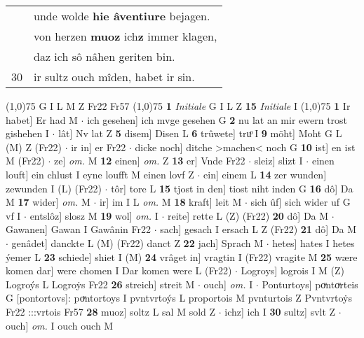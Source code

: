\documentclass[8pt,a4paper,notitlepage]{article}
\begin{document}
\begin{table}[ht]
\begin{minipage}[t]{0.5\linewidth}
\begin{tabular}{rl}
 & unde wolde \textbf{hie âventiure} bejagen.\\ 
 & von herzen \textbf{muoz} ich\textbf{z} immer klagen,\\ 
 & daz ich sô nâhen geriten bin.\\ 
30 & ir sultz ouch mîden, habet ir sin.\\ 
\end{tabular}
\scriptsize
\line(1,0){75} \newline
G I L M Z Fr22 Fr57 \newline
\line(1,0){75} \newline
\textbf{1} \textit{Initiale} G I L Z  \textbf{15} \textit{Initiale} I  \newline
\line(1,0){75} \newline
\textbf{1} Ir habet] Er had M  $\cdot$ ich gesehen] ich mvge gesehen G \textbf{2} nu lat an mir ewern trost gishehen I  $\cdot$ lât] Nv lat Z \textbf{5} disem] Disen L \textbf{6} trûwete] truͦ I \textbf{9} möht] Moht G L (M) Z (Fr22)  $\cdot$ ir in] er Fr22  $\cdot$ dicke noch] ditche >machen< noch G \textbf{10} ist] en ist M (Fr22)  $\cdot$ ze] \textit{om.} M \textbf{12} einen] \textit{om.} Z \textbf{13} er] Vnde Fr22  $\cdot$ sleiz] slizt I  $\cdot$ einen louft] ein chlust I eyne loufft M einen lovf Z  $\cdot$ ein] einem L \textbf{14} zer wunden] zewunden I (L) (Fr22)  $\cdot$ tôr] tore L \textbf{15} tjost in den] tiost niht inden G \textbf{16} dô] Da M \textbf{17} wider] \textit{om.} M  $\cdot$ ir] im I L \textit{om.} M \textbf{18} kraft] leit M  $\cdot$ sich ûf] sich wider uf G vf I  $\cdot$ entslôz] slosz M \textbf{19} wol] \textit{om.} I  $\cdot$ reite] rette L (Z) (Fr22) \textbf{20} dô] Da M  $\cdot$ Gawanen] Gawan I Gawânin Fr22  $\cdot$ sach] gesach I ersach L Z (Fr22) \textbf{21} dô] Da M  $\cdot$ genâdet] danckte L (M) (Fr22) danct Z \textbf{22} jach] Sprach M  $\cdot$ hetes] hates I hetes ýemer L \textbf{23} schiede] shiet I (M) \textbf{24} vrâget in] vragtin I (Fr22) vragite M \textbf{25} wære komen dar] were chomen I Dar komen were L (Fr22)  $\cdot$ Logroys] logrois I M (Z) Logroýs L Logroẏs Fr22 \textbf{26} streich] streit M  $\cdot$ ouch] \textit{om.} I  $\cdot$ Ponturtoys] poͮntoͮrteis G [pontortovs]: poͮntortoys I pvntvrtoýs L proportois M pvnturtois Z Pvntvrtoẏs Fr22 :::vrtois Fr57 \textbf{28} muoz] soltz L sal M sold Z  $\cdot$ ichz] ich I \textbf{30} sultz] svlt Z  $\cdot$ ouch] \textit{om.} I ouch ouch M \newline
\end{minipage}
\hspace{0.5cm}

\end{table}
\end{document}
